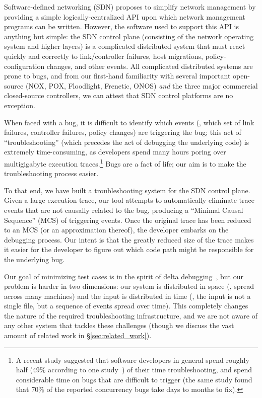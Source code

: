 Software-defined networking (SDN) proposes to simplify network management by
providing a simple logically-centralized API upon which network management
programs can be written.  However, the software used to support this API is
anything but simple: the SDN control plane (consisting of the network
operating system and higher layers) is a complicated distributed system that
must react quickly and correctly to link/controller failures, host migrations,
policy-configuration changes, and other events.
All complicated distributed systems are prone to bugs, and from our first-hand familiarity with several important open-source (NOX, POX, Floodlight, Frenetic, ONOS) \emph{and} the three major commercial closed-source controllers, we can attest that SDN control platforms are no exception.

When faced with a bug, it is difficult to identify which events (\ie, which
set of link failures, controller failures, policy changes) are triggering the
bug; this act of ``troubleshooting'' (which precedes the act of debugging the
underlying code) is extremely time-consuming, as developers spend many hours poring
over multigigabyte execution traces.\footnote{A recent study suggested that software developers in general spend roughly half (49\% according to one
study~\cite{msoft_concurrency}) of their time troubleshooting, and spend
considerable time on bugs that are difficult to trigger (the same study found
that 70\% of the reported concurrency bugs take days to months to fix).} Bugs
are a fact of life; our aim is to make the troubleshooting process easier.

To that end, we have built a troubleshooting system for the SDN control plane.
Given a large execution trace, our tool attempts to automatically eliminate
trace events that are not causally related to the bug, producing a ``Minimal
Causal Sequence'' (MCS) of triggering events. Once the original trace has
been reduced to an MCS (or an approximation thereof), the developer embarks
on the debugging process. Our intent is that the greatly reduced size of the trace makes it easier for the developer to figure out which code path might be responsible for the underlying bug.

Our goal of minimizing test cases is in the spirit of delta debugging~\cite{Zeller:1999:YMP:318773.318946}, but our
problem is harder in two dimensions: our system is distributed in space (\ie,
spread across many machines) and the input is distributed in time (\ie, the
input is not a single file, but a sequence of events spread over time). This
completely changes the nature of the required troubleshooting infrastructure,
and we are not aware of any other system that tackles these challenges (though
we discuss the vast amount of related work in \S\ref{sec:related_work}).

